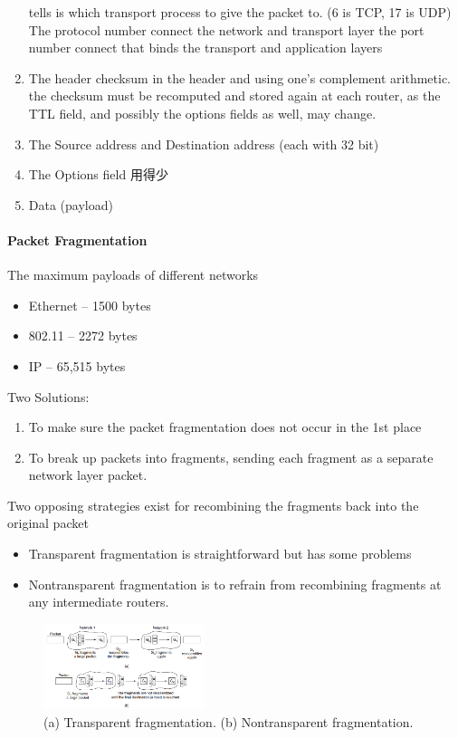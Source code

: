 \begin{enumerate}
    \subitem tells is which transport process to give the packet to. (6 is TCP, 17 is UDP)
    \subitem The protocol number connect the network and transport layer
    \subitem the port number connect that binds the transport and application layers
    \item The header checksum
    \subitem in the header and using one's complement arithmetic.
    \subitem the checksum must be recomputed and stored again at each router, as the TTL field, and possibly the options fields as well, may change.
    \item The Source address and Destination address (each with 32 bit)
    \item The Options field 用得少
    \item Data (payload)
\end{enumerate}

\paragraph{Packet Fragmentation}
The maximum payloads of different networks
\begin{itemize}
    \item Ethernet -- 1500 bytes
    \item 802.11 -- 2272 bytes
    \item IP -- 65,515 bytes
\end{itemize}

Two Solutions:
\begin{enumerate}
    \item To make sure the packet fragmentation does not occur in the 1st place
    \item To break up packets into fragments, sending each fragment as a separate network layer packet.
\end{enumerate}

Two opposing strategies exist for recombining the fragments back into the original packet
\begin{itemize}
    \item Transparent fragmentation is straightforward but has some problems
    \item Nontransparent fragmentation is to refrain from recombining fragments at any intermediate routers.
\end{itemize}

\begin{figure}[!htb]
    \centering
    \includegraphics[width=0.42\textwidth]{pic/CN5/recombining the fragments}
    \caption{(a) Transparent fragmentation. (b) Nontransparent fragmentation.}
\end{figure}

